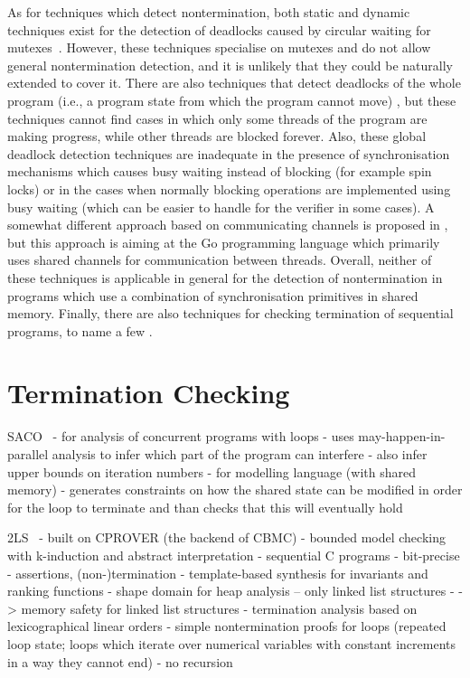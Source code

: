 As for techniques which detect nontermination, both static and dynamic
techniques exist for the detection of deadlocks caused by circular waiting for
mutexes~\cite{CC14,agarwal2010detection,bensalem2005scalable}.
However, these techniques specialise on mutexes and do not allow general nontermination detection, and it is unlikely that they could be naturally extended to cover it.
There are also techniques that detect deadlocks of the whole program (i.e., a program state from which the program cannot move) \cite{Chaki2005,Demartini99}, but these techniques cannot find cases in which only some threads of the program are making progress, while other threads are blocked forever.
Also, these global deadlock detection techniques are inadequate in the presence of synchronisation mechanisms which causes busy waiting instead of blocking (for example spin locks) or in the cases when normally blocking operations are implemented using busy waiting (which can be easier to handle for the verifier in some cases).
A somewhat different approach based on communicating channels is proposed in \cite{Ng2016}, but this approach is aiming at the Go programming language which primarily uses shared channels for communication between threads.
Overall, neither of these techniques is applicable in general for the detection of nontermination in programs which use a combination of synchronisation primitives in shared memory.
Finally, there are also techniques for checking termination of sequential programs, to name a few \cite{Giesl2017,Chen2018}.

\section{Termination Checking}

SACO~\cite{Albert2017}
- for analysis of concurrent programs with loops
- uses may-happen-in-parallel analysis to infer which part of the program can interfere
- also infer upper bounds on iteration numbers
- for modelling language (with shared memory)
- generates constraints on how the shared state can be modified in order for the loop to terminate and than checks that this will eventually hold

2LS~\cite{Malik2018}
- built on CPROVER (the backend of CBMC)
- bounded model checking with k-induction and abstract interpretation
- sequential C programs
- bit-precise
- assertions, (non-)termination
- template-based synthesis for invariants and ranking functions
- shape domain for heap analysis -- only linked list structures
  - -> memory safety for linked list structures
- termination analysis based on lexicographical linear orders
- simple nontermination proofs for loops (repeated loop state; loops which iterate over numerical variables with constant increments in a way they cannot end)
- no recursion

